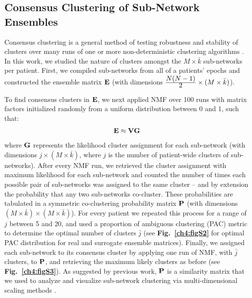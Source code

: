 \subsection{Consensus Clustering of Sub-Network Ensembles}
Consensus clustering is a general method of testing robustness and stability of clusters over many runs of one or more non-deterministic clustering algorithms \cite{monti2003consensus}. In this work, we studied the nature of clusters amongst the $M\times\bar{k}$ sub-networks per patient. First, we compiled sub-networks from all of a patients' epochs and constructed the ensemble matrix $\mathbf{\displaystyle E}$ (with dimensions $\frac{\displaystyle N(N-1)}{\displaystyle 2} \times (M \times \bar{k})$). 

To find consensus clusters in $\mathbf{\displaystyle E}$, we next applied NMF over 100 runs with matrix factors initialized randomly from a uniform distribution between 0 and 1, such that:
\begin{eqnarray}
    \mathbf{\displaystyle E} \approx \mathbf{\displaystyle V}\mathbf{\displaystyle G}
\end{eqnarray}
where $\mathbf{\displaystyle G}$ represents the likelihood cluster assignment for each sub-network (with dimensions $j \times (M \times \bar{k})$, where $j$ is the number of patient-wide clusters of sub-networks). After every NMF run, we retrieved the cluster assignment with maximum likelihood for each sub-network and counted the number of times each possible pair of sub-networks was assigned to the same cluster -- and by extension the probability that any two sub-networks co-cluster. These probabilities are tabulated in a symmetric co-clustering probability matrix $\mathbf{\displaystyle P}$ (with dimensions $(M \times \bar{k}) \times (M \times \bar{k})$). For every patient we repeated this process for a range of $j$ between 5 and 20, and used a proportion of ambiguous clustering (PAC) metric to determine the optimal number of clusters $\bar{j}$ \cite{senbabaoglu2014critical}(see \textbf{Fig.~\ref{ch4:figS2}} for optimal PAC distribution for real and surrogate ensemble matrices). Finally, we assigned each sub-network to its consensus cluster by applying one run of NMF, with $\bar{j}$ clusters, to $\mathbf{\displaystyle P}$, and retrieving the maximum likely clusters as before (see \textbf{Fig.~\ref{ch4:figS3}}). As suggested by previous work, $\mathbf{\displaystyle P}$ is a similarity matrix \cite{monti2003consensus} that we used to analyze and visualize sub-network clustering via multi-dimensional scaling methods \cite{borg2005modern}. 

